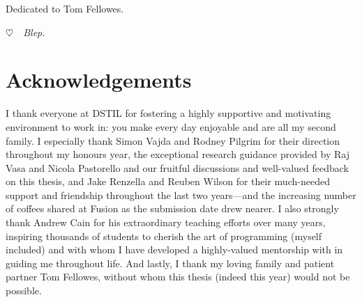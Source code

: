\cleardoublepage
\pagestyle{empty}
\begin{center}
  \vspace*{0.3\paperheight}
  Dedicated to Tom Fellowes.
  
  {\color{white} \itshape $\heartsuit$~~Blep.}
\end{center}
\pagestyle{fancy}

\chapter*{Acknowledgements}

I thank everyone at DSTIL for fostering a highly supportive and motivating environment to work in: you make every day enjoyable and are all my second family. I especially thank Simon Vajda and Rodney Pilgrim for their direction throughout my honours year, the exceptional research guidance provided by Raj Vasa and Nicola Pastorello and our fruitful discussions and well-valued feedback on this thesis, and Jake Renzella and Reuben Wilson for their much-needed support and friendship throughout the last two years---and the increasing number of coffees shared at Fusion as the submission date drew nearer. I also strongly thank Andrew Cain for his extraordinary teaching efforts over many years, inspiring thousands of students to cherish the art of programming (myself included) and with whom I have developed a highly-valued mentorship with in guiding me throughout life. And lastly, I thank my loving family and patient partner Tom Fellowes, without whom this thesis (indeed this year) would not be possible.
